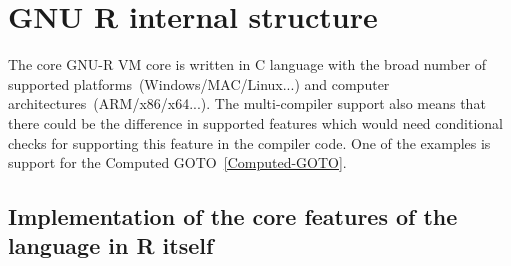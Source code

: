 \documentclass[thesis=M,english]{FITthesis}[2018/10/20]
\begin{document}







\section{GNU R internal structure}\label{R-internal-structure}

The core GNU-R VM core is written in C language with the broad number of supported platforms~(Windows/MAC/Linux...) and computer architectures~(ARM/x86/x64...). The multi-compiler support also means that there could be the difference in supported features which would need conditional checks for supporting this feature in the compiler code. One of the examples is support for the Computed GOTO~\ref{Computed-GOTO}.

\subsection{Implementation of the core features of the language in R itself}
\end{document}
